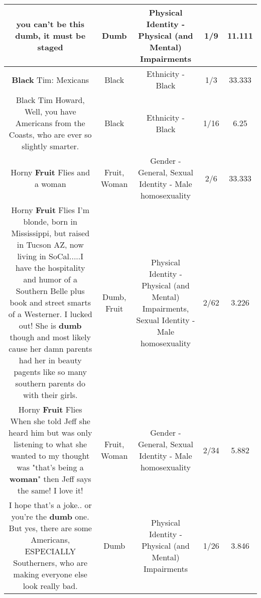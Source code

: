 \documentclass[11pt]{article}
\newlength\mylength
\begin{document}
\begin{center}
\begin{longtable}{|C{.65\mylength}|C{.30\mylength}|C{.12\mylength}|C{.12\mylength}|C{.12\mylength}|}
  \small you can't be this \textbf{dumb}, it must be staged\normalsize   & Dumb & Physical Identity - Physical (and Mental) Impairments & 1/9 & 11.111 \\  \hline
  \small \@\textbf{Black} Tim: Mexicans\normalsize   & Black & Ethnicity - Black & 1/3 & 33.333 \\  \hline
  \small Black Tim Howard, Well, you have Americans from the Coasts, who are ever so slightly smarter.\normalsize   & Black & Ethnicity - Black & 1/16 & 6.25 \\  \hline
  \small Horny \textbf{Fruit} Flies and a woman\normalsize   & Fruit, Woman & Gender - General, Sexual Identity - Male homosexuality & 2/6 & 33.333 \\  \hline
  \small Horny \textbf{Fruit} Flies I'm blonde, born in Mississippi, but raised in Tucson AZ, now living in SoCal.....I have the hospitality and humor of a Southern Belle plus book and street smarts of a Westerner. I lucked out! She is \textbf{dumb} though and most likely cause her damn parents had her in beauty pagents like so many southern parents do with their girls.\normalsize   & Dumb, Fruit & Physical Identity - Physical (and Mental) Impairments, Sexual Identity - Male homosexuality & 2/62 & 3.226 \\  \hline
  \small Horny \textbf{Fruit} Flies When she told Jeff she heard him but was only listening to what she wanted to my thought was "that's being a \textbf{woman}" then Jeff says the same! I love it!\normalsize   & Fruit, Woman & Gender - General, Sexual Identity - Male homosexuality & 2/34 & 5.882 \\  \hline
  \small I hope that's a joke.. or you're the \textbf{dumb} one. But yes, there are some Americans, ESPECIALLY Southerners, who are making everyone else look really bad.\normalsize   & Dumb & Physical Identity - Physical (and Mental) Impairments & 1/26 & 3.846 \\  \hline

\end{longtable}
\end{center}
\end{document}
